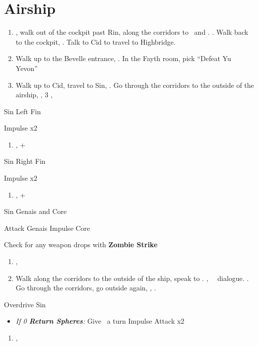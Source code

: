 \chapter{Airship}
\begin{enumerate}
  \item \sd, walk out of the cockpit past Rin, along the corridors to \yuna\ and \kimahri. \sd. Walk back to the cockpit, \sd. Talk to Cid to travel to Highbridge.
  \item Walk up to the Bevelle entrance, \sd. In the Fayth room, pick ``Defeat Yu Yevon''
  \item Walk up to Cid, travel to Sin, \sd. Go through the corridors to the outside of the airship, \sd, 3 \skippablefmv[2:10], \sd
\end{enumerate}
\begin{battle}[65000]{Sin Left Fin}
  \begin{itemize}
    \summon{\bahamut}
    \bahamutf Impulse x2
  \end{itemize}
\end{battle}
\begin{enumerate}[resume]
  \item \sd, \cs+\skippablefmv
\end{enumerate}
\begin{battle}[65000]{Sin Right Fin}
  \begin{itemize}
    \summon{\bahamut}
    \bahamutf Impulse x2
  \end{itemize}
\end{battle}
\begin{enumerate}[resume]
  \item \sd, \cs+\skippablefmv
\end{enumerate}
\begin{battle}[56000]{Sin Genais and Core}
  \begin{itemize}
    \summon{\bahamut}
    \bahamutf Attack Genais
    \bahamutf Impulse Core
  \end{itemize}
  Check for any weapon drops with \textbf{Zombie Strike}
\end{battle}
\begin{enumerate}[resume]
  \item \sd, \skippablefmv
  \item Walk along the corridors to the outside of the ship, speak to \yuna. \cs[1:40], \sd\ \rikku\ dialogue. \skippablefmv. Go through the corridors, go outside again, \skippablefmv, \sd.
\end{enumerate}
\begin{battle}[140000]{Overdrive Sin}
  \begin{itemize}
    \item \textit{If 0 \textbf{Return Spheres}:} Give \tidus\ a turn
          \summon{\bahamut}
          \bahamutf Impulse
          \bahamutf Attack x2
  \end{itemize}
\end{battle}
\begin{enumerate}[resume]
  \item \skippablefmv[1:20], \sd
\end{enumerate}